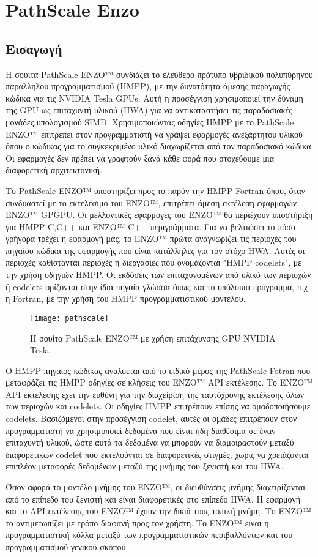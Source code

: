 \section{PathScale Enzo}
\subsection{Εισαγωγή}
Η σουίτα PathScale ENZO™ συνδιάζει το ελεύθερο πρότυπο υβριδικού πολυπύρηνου παράλληλου προγραμματισμού (HMPP), με την δυνατότητα άμεσης παραγωγής κώδικα για τις NVIDIA Tesla GPUs. Αυτή η προσέγγιση χρησιμοποιεί την δύναμη της GPU ως επιταχυντή υλικού (HWA) για να αντικαταστήσει τις παραδοσιακές μονάδες υπολογισμού SIMD. Χρησιμοποιώντας οδηγίες HMPP με το PathScale ENZO™ επιτρέπει στον προγραμματιστή να γράψει εφαρμογές ανεξάρτητου υλικού όπου ο κώδικας για το συγκεκριμένο υλικό διαχωρίζεται από τον παραδοσιακό κώδικα. Οι εφαρμογές δεν πρέπει να γραφτούν ξανά κάθε φορά που στοχεύουμε μια διαφορετική αρχιτεκτονική. 

Το PathScale ENZO™ υποστηρίζει προς το παρόν την HMPP Fortran όπου, όταν συνδυαστεί με το εκτελέσιμο του ENZO™, επιτρέπει άμεση εκτέλεση εφαρμογών ENZO™ GPGPU. Οι μελλοντικές εφαρμογές του ENZO™ θα περιέχουν υποστήριξη για HMPP C,C++ και ENZO™ C++ περιγράμματα. Για να βελτιώσει το πόσο γρήγορα τρέχει η εφαρμογή μας, το ENZO™ πρώτα αναγνωρίζει τις περιοχές του πηγαίου κώδικα της εφαρμογής που είναι κατάλληλες για τον στόχο HWA. Αυτές οι περιοχές καθίστανται περιοχές ή διεργασίες που ονομάζονται "HMPP codelets", με την χρήση οδηγιών HMPP. Οι εκδόσεις των επιταχυνομένων από υλικό των περιοχών ή codelets ορίζονται στην ίδια πηγαία γλώσσα όπως και το υπόλοιπο πρόγραμμα, π.χ η Fortran, με την χρήση του HMPP προγραμματιστικού μοντέλου.\cite{pathscale-1}

\begin{figure}[h]
	\texttt{[image: pathscale]}
	\centering
	\caption{Η σουίτα PathScale ENZO™ με χρήση επιτάχυνσης GPU NVIDIA Tesla}
\end{figure}


Ο HMPP πηγαίος κώδικας αναλύεται από το ειδικό μέρος της PathScale Fotran που μεταφράζει τις HMPP οδηγίες σε κλήσεις του ENZO™ API εκτέλεσης. Το ENZO™ API εκτέλεσης έχει την ευθύνη για την διαχείριση της ταυτόχρονης εκτέλεσης όλων των περιοχών και codelets. Οι οδηγίες HMPP επιτρέπουν επίσης να ομαδοποιήσουμε codelets. Βασιζόμενοι στην προσέγγιση codelet, αυτές οι ομάδες επιτρέπουν στον προγραμματιστή να χρησιμοποιεί δεδομένα που είναι ήδη διαθέσιμα σε έναν επιταχυντή υλικού, ώστε αυτά τα δεδομένα να μπορούν να διαμοιραστούν μεταξύ διαφορετικών codelet που εκτελούνται σε διαφορετικές στιγμές, χωρίς να χρειάζονται επιπλέον μεταφορές δεδομένων μεταξύ της μνήμης του ξενιστή και του HWA.

Όσον αφορά το μοντέλο μνήμης του ENZO™, οι διευθύνσεις μνήμης διαχειρίζονται από το επίπεδο του ξενιστή και είναι διαφορετικές στο επίπεδο HWA. Η εφαρμογή και το API εκτέλεσης του ENZO™ έχουν την δικιά τους τοπική μνήμη. Το ENZO™ το αντιμετωπίζει με τρόπο διαφανή προς τον χρήστη. Το ENZO™ είναι η προγραμματιστική κόλλα μεταξύ των προγραμματιστικών περιβαλλόντων και του προγραμματισμού γενικού σκοπού.

